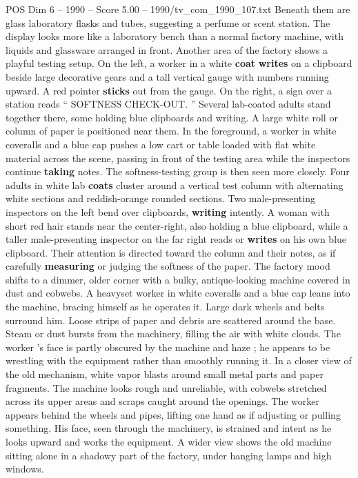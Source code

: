 \begin{textsample}{POS Dim 6 – 1990 – Score 5.00 – 1990/tv\_com\_1990\_107.txt}
Beneath them are glass laboratory flasks and tubes, suggesting a perfume or scent station.
The display looks more like a laboratory bench than a normal factory machine, with liquids and glassware arranged in front.
Another area of the factory shows a playful testing setup.
On the left, a worker in a white \textbf{coat} \textbf{writes} on a clipboard beside large decorative gears and a tall vertical gauge with numbers running upward.
A red pointer \textbf{sticks} out from the gauge.
On the right, a sign over a station reads “ SOFTNESS CHECK-OUT. ” Several lab-coated adults stand together there, some holding blue clipboards and writing.
A large white roll or column of paper is positioned near them.
In the foreground, a worker in white coveralls and a blue cap pushes a low cart or table loaded with flat white material across the scene, passing in front of the testing area while the inspectors continue \textbf{taking} notes.
The softness-testing group is then seen more closely.
Four adults in white lab \textbf{coats} cluster around a vertical test column with alternating white sections and reddish-orange rounded sections.
Two male-presenting inspectors on the left bend over clipboards, \textbf{writing} intently.
A woman with short red hair stands near the center-right, also holding a blue clipboard, while a taller male-presenting inspector on the far right reads or \textbf{writes} on his own blue clipboard.
Their attention is directed toward the column and their notes, as if carefully \textbf{measuring} or judging the softness of the paper.
The factory mood shifts to a dimmer, older corner with a bulky, antique-looking machine covered in dust and cobwebs.
A heavyset worker in white coveralls and a blue cap leans into the machine, bracing himself as he operates it.
Large dark wheels and belts surround him.
Loose strips of paper and debris are scattered around the base.
Steam or dust bursts from the machinery, filling the air with white clouds.
The worker ’s face is partly obscured by the machine and haze ; he appears to be wrestling with the equipment rather than smoothly running it.
In a closer view of the old mechanism, white vapor blasts around small metal parts and paper fragments.
The machine looks rough and unreliable, with cobwebs stretched across its upper areas and scraps caught around the openings.
The worker appears behind the wheels and pipes, lifting one hand as if adjusting or pulling something.
His face, seen through the machinery, is strained and intent as he looks upward and works the equipment.
A wider view shows the old machine sitting alone in a shadowy part of the factory, under hanging lamps and high windows.

\end{textsample}
